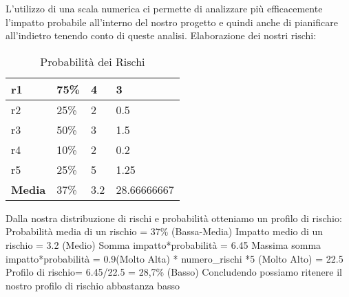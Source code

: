 	L’utilizzo di una scala numerica ci permette di analizzare più efficacemente l’impatto probabile all’interno del nostro progetto e quindi anche di pianificare all’indietro tenendo conto di queste analisi.
	Elaborazione dei nostri rischi:
	\begin{table}[h!]
		\centering
		\renewcommand{\arraystretch}{2} 
		\begin{tabular}{|l|l|l|l|}
			\rowcolor{orange!50}
			\hline
			r1 & 75\% & 4 & 3 \\
			\hline
			r2 &  25\%  & 2  & 0.5 \\
			\hline
			r3  & 50\%  & 3  & 1.5 \\
			\hline
			r4  & 10\% &  2 &  0.2 \\
			\hline
			r5  & 25\%  & 5  & 1.25 \\
			\hline
			\textbf{Media}  & 37\% &  3.2 &  28.66666667\\
			\hline
		\end{tabular}
		\caption{Probabilità dei Rischi}
	\end{table}
	\clearpage 
	Dalla nostra distribuzione di rischi e probabilità otteniamo un profilo di rischio:\newline
	Probabilità media di un rischio = 37\% (Bassa-Media)\newline
	Impatto medio di un rischio = 3.2 (Medio)\newline
	Somma impatto*probabilità = 6.45\newline
	Massima somma impatto*probabilità = 0.9(Molto Alta) * numero\_rischi *5 (Molto Alto) = 22.5\newline
	Profilo di rischio= 6.45/22.5 = 28,7\% (Basso)\newline
	Concludendo possiamo ritenere il nostro profilo di rischio abbastanza basso